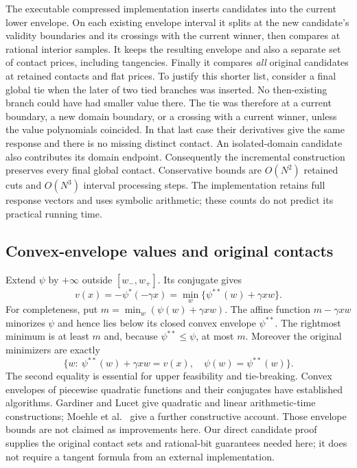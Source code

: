 The executable compressed implementation inserts candidates into the current
lower envelope. On each existing envelope interval it splits at the new
candidate's validity boundaries and its crossings with the current winner,
then compares at rational interior samples. It keeps the resulting envelope
and also a separate set of contact prices, including tangencies. Finally it
compares \emph{all} original candidates at retained contacts and flat prices.
To justify this shorter list, consider a final global tie when the later of
two tied branches was inserted. No then-existing branch could have had smaller
value there. The tie was therefore at a current boundary, a new domain
boundary, or a crossing with a current winner, unless the value polynomials
coincided. In that last case their derivatives give the same response and
there is no missing distinct contact. An isolated-domain candidate also
contributes its domain endpoint. Consequently the incremental construction
preserves every final global contact. Conservative bounds are $O(N^2)$ retained
cuts and $O(N^3)$ interval processing steps. The implementation retains full
response vectors and uses symbolic arithmetic; these counts do not predict
its practical running time.

\subsection{Convex-envelope values and original contacts}
\label{subsec:contacts}
Extend $\psi$ by $+\infty$ outside $[w_-,w_+]$. Its conjugate gives
\begin{equation}\label{eq:contact-conjugacy}
 v(x)=-\psi^*(-\gamma x)
     =\min_w\{\psi^{**}(w)+\gamma xw\}.
\end{equation}
For completeness, put $m=\min_w(\psi(w)+\gamma xw)$. The affine function
$m-\gamma xw$ minorizes $\psi$ and hence lies below its closed convex envelope
$\psi^{**}$. The rightmost minimum is at least $m$ and, because
$\psi^{**}\le\psi$, at most $m$. Moreover the original minimizers are exactly
\begin{equation}\label{eq:actual-contact}
 \{w:\ \psi^{**}(w)+\gamma xw=v(x),\quad \psi(w)=\psi^{**}(w)\}.
\end{equation}
The second equality is essential for upper feasibility and tie-breaking.
Convex envelopes of piecewise quadratic functions and their conjugates have
established algorithms. Gardiner and Lucet
\citep[Propositions 3.1 and 4.3]{GardinerLucet2010} give quadratic and linear
arithmetic-time constructions; Moehle et al.~\citep[Section 6.3 and Appendix B]{MoehleEtAl2023}
give a further constructive account. Those envelope bounds are not claimed
as improvements here. Our direct
candidate proof supplies the original contact sets and rational-bit guarantees
needed here; it does not require a tangent formula from an external
implementation.

